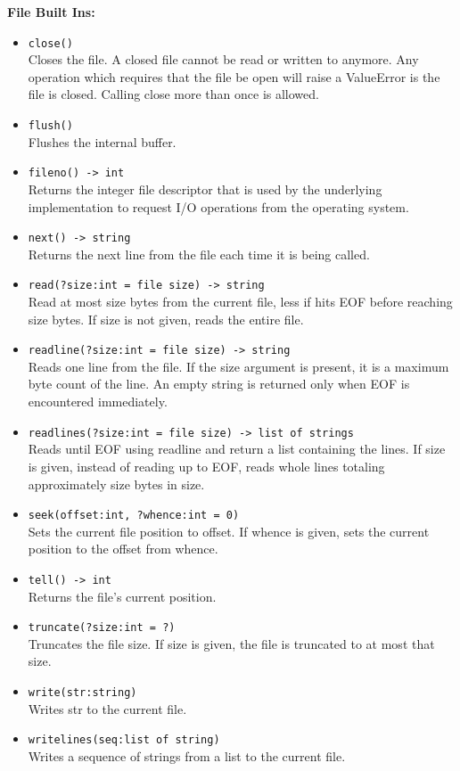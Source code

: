 \documentclass{article}
\begin{document}
\textbf{File Built Ins:}
\begin{itemize}
\item \verb|close()| \\
Closes the file. A closed file cannot be read or written to anymore. Any operation which requires that the file be open will raise a ValueError is the file is closed. Calling close more than once is allowed. 

\item \verb|flush()| \\
    Flushes the internal buffer. 

\item \verb|fileno() -> int| \\
Returns the integer file descriptor that is used by the underlying implementation to request I/O operations from the operating system. 

\item \verb|next() -> string| \\
Returns the next line from the file each time it is being called. 

\item \verb|read(?size:int = file size) -> string| \\
Read at most size bytes from the current file, less if hits EOF before reaching size bytes. If size is not given, reads the entire file. 
    
\item \verb|readline(?size:int = file size) -> string| \\
Reads one line from the file. If the size argument is present, it is a maximum byte count of the line. An empty string is returned only when EOF is encountered immediately. 

\item \verb|readlines(?size:int = file size) -> list of strings| \\
Reads until EOF using readline and return a list containing the lines. If size is given, instead of reading up to EOF, reads whole lines totaling approximately size bytes in size. 

\item \verb|seek(offset:int, ?whence:int = 0)| \\
Sets the current file position to offset. If whence is given, sets the current position to the offset from whence. 

\item \verb|tell() -> int| \\
    Returns the file’s current position. 

\item \verb|truncate(?size:int = ?)| \\
    Truncates the file size. If size is given, the file is truncated to at most that size. 

\item \verb|write(str:string)| \\
    Writes str to the current file. 

\item \verb|writelines(seq:list of string)| \\
    Writes a sequence of strings from a list to the current file. 
\end{itemize}
\end{document}
